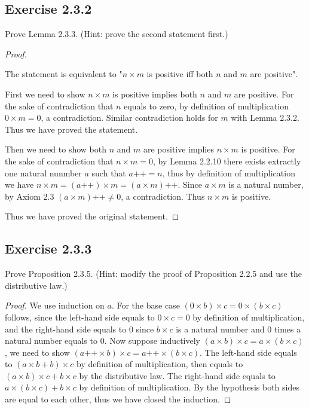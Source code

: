 \documentclass[a4paper]{article}
\begin{document}
\subsection*{Exercise 2.3.2}

Prove Lemma 2.3.3. (Hint: prove the second statement first.)

\begin{proof}

$ $\newline

The statement is equivalent to "$n\times m$ is positive iff both $n$ and  $m$ are positive".

First we need to show $n\times m$ is positive implies both $n$ and  $m$ are positive. For the sake of contradiction that $n$ equals to zero, by definition of multiplication  $0\times m = 0$, a contradiction. Similar contradiction holds for $m$ with Lemma 2.3.2. Thus we have proved the statement.

Then we need to show both $n$ and  $m$ are positive implies $n\times m$ is positive. For the sake of contradiction that $n\times m = 0$, by Lemma 2.2.10 there exists extractly one natural nunmber $a$ such that  $a\text{++} = n$, thus by definition of multiplication we have $n\times m = \left( a\text{++} \right) \times m = \left( a\times m \right) \text{++}$. Since $a\times m$ is a natural number, by Axiom 2.3 $\left( a\times m \right) \text{++} \neq 0$, a contradiction. Thus $n\times m$ is positive.

Thus we have proved the original statement.

\end{proof}

\subsection*{Exercise 2.3.3}

Prove Proposition 2.3.5. (Hint: modify the proof of Proposition
2.2.5 and use the distributive law.)

\begin{proof}

	We use induction on $a$. For the base case $\left( 0\times b \right) \times c = 0 \times \left( b\times c \right) $ follows, since the left-hand side equals to $0\times c = 0$ by definition of multiplication, and the right-hand side equals to $0$ since $b\times c$ is a natural number and $0$ times a natural number equals to $0$. Now suppose inductively $\left( a\times b \right) \times c = a\times \left( b\times c \right) $, we need to show $\left( a\text{++}\times b \right) \times c = a\text{++}\times \left( b\times c \right) $. The left-hand side equals to $\left( a\times b + b \right) \times c$ by definition of multiplication, then equals to $\left( a\times b \right) \times c + b\times c$ by the distributive law. The right-hand side equals to $a\times \left( b\times c \right) + b\times c$ by definition of multiplication. By the hypothesis both sides are equal to each other, thus we have closed the induction.

\end{proof}
\end{document}
